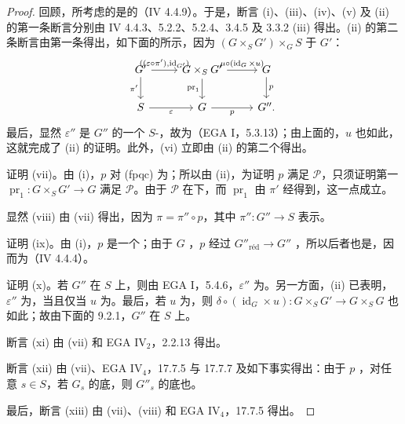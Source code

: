 \begin{proof}
回顾，所考虑的是的（IV 4.4.9）。于是，断言 (i)、(iii)、(iv)、(v) 及 (ii) 的第一条断言分别由 IV 4.4.3、5.2.2、5.2.4、3.4.5 及 3.3.2 (iii) 得出。(ii) 的第二条断言由第一条得出，如下面的所示，因为 $(G\times_S G')\times_G S$ 于 $G'$：
\[
\begin{tikzcd}
G'\arrow[r,"{((\varepsilon\circ\pi'),\operatorname{id}_{G'})}"]\arrow[d,"\pi'"']
&G\times_S G'\arrow[r,"\mu\circ(\operatorname{id}_G\times u)"]\arrow[d,"\operatorname{pr}_1"']
&G\arrow[d,"p"]\\
S\arrow[r,"\varepsilon"']&G\arrow[r,"p"']&G''.
\end{tikzcd}
\]
最后，显然 $\varepsilon''$ 是 $G''$ 的一个 $S$-，故为（EGA I，5.3.13）；由上面的，$u$ 也如此，这就完成了 (ii) 的证明。此外，(vi) 立即由 (ii) 的第二个得出。

证明 (vii)。由 (i)，$p$ 对 (fpqc) 为；所以由 (ii)，为证明 $p$ 满足 $\mathscr P$，只须证明第一 $\operatorname{pr}_1:G\times_S G'\to G$ 满足 $\mathscr P$。由于 $\mathscr P$ 在下，而 $\operatorname{pr}_1$ 由 $\pi'$ 经得到，这一点成立。

显然 (viii) 由 (vii) 得出，因为 $\pi=\pi''\circ p$，其中 $\pi'':G''\to S$ 表示。

证明 (ix)。由 (i)，$p$ 是一个；由于 $G$ ，$p$ 经过 $G''_{\mathrm{r\text{é}d}}\to G''$ ，所以后者也是，因而为（IV 4.4.4）。

证明 (x)。若 $G''$ 在 $S$ 上，则由 EGA I，5.4.6，$\varepsilon''$ 为。另一方面，(ii) 已表明，$\varepsilon''$ 为，当且仅当 $u$ 为。最后，若 $u$ 为，则 $\delta\circ(\operatorname{id}_G\times u):G\times_S G'\to G\times_S G$ 也如此；故由下面的 9.2.1，$G''$ 在 $S$ 上。

断言 (xi) 由 (vii) 和 EGA $\mathrm{IV}_2$，2.2.13 得出。

断言 (xii) 由 (vii)、EGA $\mathrm{IV}_4$，17.7.5 与 17.7.7 及如下事实得出：由于 $p$ ，对任意 $s\in S$，若 $G_s$ 的底，则 $G''_s$ 的底也。

最后，断言 (xiii) 由 (vii)、(viii) 和 EGA $\mathrm{IV}_4$，17.7.5 得出。
\end{proof}

